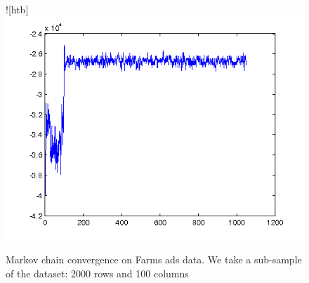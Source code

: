 \begin{figure}![htb]
\includegraphics[width=1\textwidth]{samplingConvergence.png}
\caption{Markov chain convergence on Farms ads data. We take a sub-sample of
the dataset: 2000 rows and 100 columns}
\label{fig:MCMCconverge}
\end{figure}
